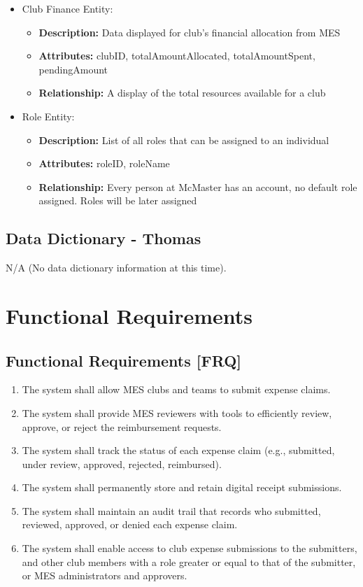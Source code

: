 \documentclass[12pt]{article}
\begin{document}
\begin{itemize}
    \item Club Finance Entity:
      \begin{itemize}
          \item \textbf{Description:} Data displayed for club's financial allocation from MES
          \item \textbf{Attributes:} clubID, totalAmountAllocated, totalAmountSpent, pendingAmount
          \item \textbf{Relationship:} A display of the total resources available for a club 
        \end{itemize}

    \item Role Entity:
      \begin{itemize}
          \item \textbf{Description:} List of all roles that can be assigned to an individual
          \item \textbf{Attributes:} roleID, roleName
          \item \textbf{Relationship:} Every person at McMaster has an account, no default role assigned. Roles will be later assigned
        \end{itemize}
  \end{itemize}
  \subsection{Data Dictionary - Thomas}
  N/A (No data dictionary information at this time).

\section{Functional Requirements}
  \subsection{Functional Requirements [FRQ]}
    \begin{enumerate}
      \item The system shall allow MES clubs and teams to submit expense claims. 
      \item The system shall provide MES reviewers with tools to efficiently review, approve, or reject the reimbursement requests.
      \item The system shall track the status of each expense claim (e.g., submitted, under review, approved, rejected, reimbursed).
      \item The system shall permanently store and retain digital receipt submissions.
      \item The system shall maintain an audit trail that records who submitted, reviewed, approved, or denied each expense claim.
      \item The system shall enable access to club expense submissions to the submitters, and other club members with a role greater or equal to that of the submitter, or MES administrators and approvers.
    \end{enumerate}
\end{document}
